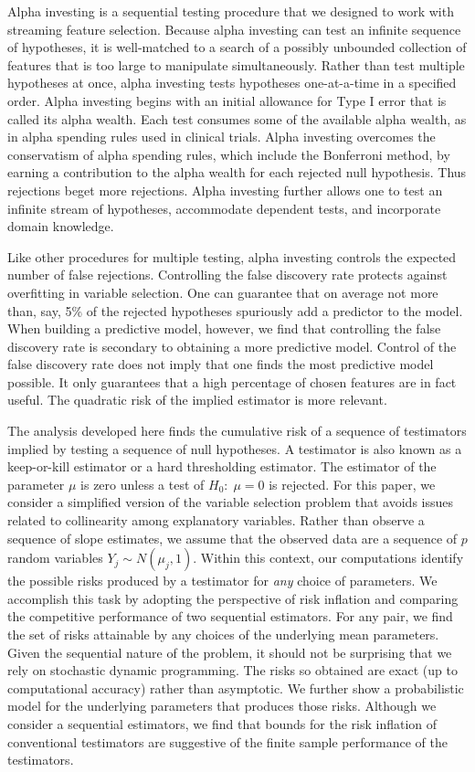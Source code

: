 \documentclass[12pt]{article}
\begin{document}
 Alpha investing \citep{fosterstine08} is a sequential testing procedure that we
 designed to work with streaming feature selection.  Because alpha investing can
 test an infinite sequence of hypotheses, it is well-matched to a search of a
 possibly unbounded collection of features that is too large to manipulate
 simultaneously.  Rather than test multiple hypotheses at once, alpha investing
 tests hypotheses one-at-a-time in a specified order.  Alpha investing begins
 with an initial allowance for Type I error that is called its alpha wealth.
  Each test consumes some of the available alpha wealth, as in alpha spending
 rules used in clinical trials.  Alpha investing overcomes the conservatism of
 alpha spending rules, which include the Bonferroni method, by earning a
 contribution to the alpha wealth for each rejected null hypothesis.  Thus
 rejections beget more rejections.  Alpha investing further allows one to test
 an infinite stream of hypotheses, accommodate dependent tests, and incorporate
 domain knowledge.
 

 Like other procedures for multiple testing, alpha investing controls the
 expected number of false rejections.  Controlling the false discovery rate
 protects against overfitting in variable selection.  One can guarantee that on
 average not more than, say, 5\% of the rejected hypotheses spuriously add a
 predictor to the model.  When building a predictive model, however, we find
 that controlling the false discovery rate is secondary to obtaining a more
 predictive model.  Control of the false discovery rate does not imply that one
 finds the most predictive model possible.  It only guarantees that a high
 percentage of chosen features are in fact useful.  The quadratic risk of the
 implied estimator is more relevant.


 The analysis developed here finds the cumulative risk of a sequence of testimators implied by
 testing a sequence of null hypotheses.  A testimator is also known as a
 keep-or-kill estimator or a hard thresholding estimator.  The estimator of the
 parameter $\mu$ is zero unless a test of $H_0: \; \mu = 0$ is rejected.  For
 this paper, we consider a simplified version of the variable selection problem
 that avoids issues related to collinearity among explanatory variables.  Rather
 than observe a sequence of slope estimates, we assume that the observed data
 are a sequence of $p$ random variables $Y_j \sim N(\mu_j,1)$.  Within
 this context, our computations identify the possible risks produced by a
 testimator for {\em any} choice of parameters.  We accomplish this task by
 adopting the perspective of risk inflation and comparing the competitive
 performance of two sequential estimators.  For any pair, we find the set of
 risks attainable by any choices of the underlying mean parameters.  Given the
 sequential nature of the problem, it should not be surprising that we rely on
 stochastic dynamic programming.  The risks so obtained are exact (up to
 computational accuracy) rather than asymptotic.  We further show a
 probabilistic model for the underlying parameters that produces those risks.
  Although we consider a sequential estimators, we find that bounds for the risk
 inflation of conventional testimators are suggestive of the finite sample
 performance of the testimators.
\end{document}
